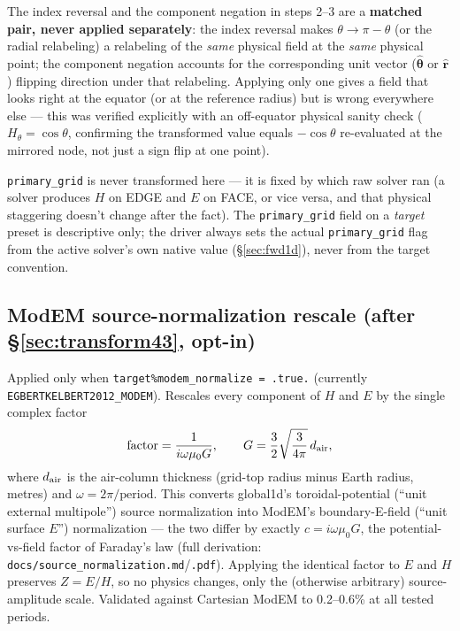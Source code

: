 \documentclass[11pt]{article}
\newcommand{\rhat}{\hat{\mathbf r}}
\newcommand{\thetahat}{\hat{\boldsymbol\theta}}
\begin{document}
The index reversal and the component negation in steps 2--3 are a \textbf{matched pair, never
applied separately}: the index reversal makes $\theta\to\pi-\theta$ (or the radial relabeling) a
relabeling of the \emph{same} physical field at the \emph{same} physical point; the component
negation accounts for the corresponding unit vector ($\thetahat$ or $\rhat$) flipping direction
under that relabeling. Applying only one gives a field that looks right at the equator (or at the
reference radius) but is wrong everywhere else --- this was verified explicitly with an
off-equator physical sanity check ($H_\theta=\cos\theta$, confirming the transformed value equals
$-\cos\theta$ re-evaluated at the mirrored node, not just a sign flip at one point).

\texttt{primary\_grid} is never transformed here --- it is fixed by which raw solver ran (a solver
produces $H$ on EDGE and $E$ on FACE, or vice versa, and that physical staggering doesn't change
after the fact). The \texttt{primary\_grid} field on a \emph{target} preset is descriptive only;
the driver always sets the actual \texttt{primary\_grid} flag from the active solver's own native
value (\S\ref{sec:fwd1d}), never from the target convention.

\subsection{ModEM source-normalization rescale (after \S\ref{sec:transform43}, opt-in)}
\label{sec:modem}

Applied only when \texttt{target\%modem\_normalize = .true.} (currently
\texttt{EGBERTKELBERT2012\_MODEM}). Rescales every component of $H$ and $E$ by the single complex
factor
\begin{equation}
\text{factor} = \frac{1}{i\omega\mu_0 G}, \qquad G = \frac{3}{2}\sqrt{\frac{3}{4\pi}}\,d_{\rm air},
\end{equation}
where $d_{\rm air}$ is the air-column thickness (grid-top radius minus Earth radius, metres) and
$\omega=2\pi/\text{period}$. This converts global1d's toroidal-potential (``unit external
multipole'') source normalization into ModEM's boundary-E-field (``unit surface $E$'')
normalization --- the two differ by exactly $c=i\omega\mu_0G$, the potential-vs-field factor of
Faraday's law (full derivation: \texttt{docs/source\_normalization.md}/\texttt{.pdf}). Applying the
identical factor to $E$ and $H$ preserves $Z=E/H$, so no physics changes, only the (otherwise
arbitrary) source-amplitude scale. Validated against Cartesian ModEM to 0.2--0.6\% at all tested
periods.
\end{document}
